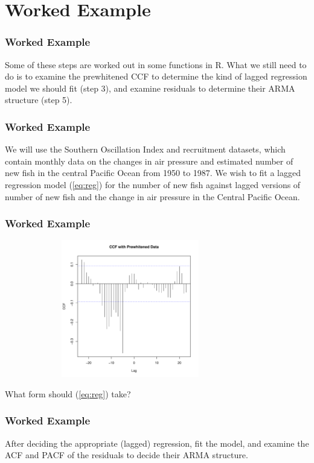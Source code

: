 \documentclass[%
xcolor=pdftex]{beamer}
\begin{document}
\section{Worked Example}
\frame{\tableofcontents[currentsection]}

\begin{frame}
\frametitle{Worked Example}

Some of these steps are worked out in some functions in R. What we still need to do is to examine the prewhitened CCF to determine the kind of lagged regression model we should fit (step 3), and examine residuals to determine their ARMA structure (step 5).


\end{frame}

\begin{frame}
\frametitle{Worked Example}

We will use the Southern Oscillation Index and recruitment datasets, which contain monthly data on the changes in air pressure and estimated number of new fish in the central Pacific Ocean from 1950 to 1987. We wish to fit a lagged regression model (\ref{eq:reg}) for the number of new fish against lagged versions of number of new fish and the change in air pressure in the Central Pacific Ocean. 

\end{frame}

\begin{frame}
\frametitle{Worked Example}

\includegraphics[width=110mm, height=60mm]{ccf_soi.pdf}

What form should (\ref{eq:reg}) take?

\end{frame}

\begin{frame}
\frametitle{Worked Example}

After deciding the appropriate (lagged) regression, fit the model, and examine the ACF and PACF of the residuals to decide their ARMA structure.

\end{frame}
\end{document}
